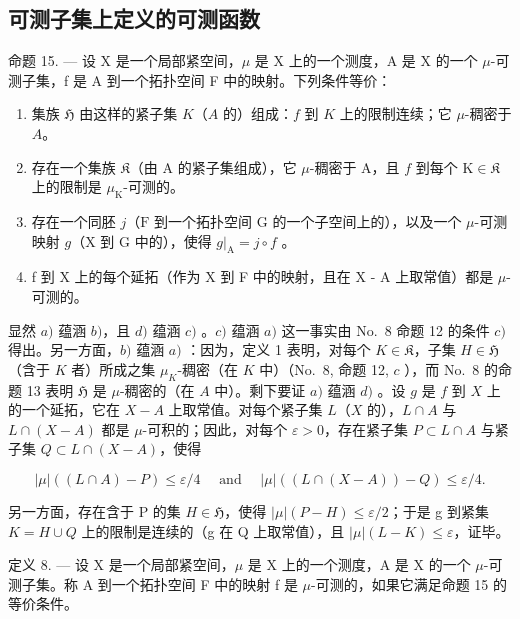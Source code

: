 \subsection{可测子集上定义的可测函数}

命题 15. --- 设 X 是一个局部紧空间，\(\mu\) 是 X 上的一个测度，A 是 X 的一个 \(\mu\)-可测子集，f 是 A 到一个拓扑空间 F 中的映射。下列条件等价：

\begin{enumerate}
\def\labelenumi{\alph{enumi})}
\item
  集族 \(\mathfrak{H}\) 由这样的紧子集 \(K\)（\(A\) 的）组成：\(f\) 到 \(K\) 上的限制连续；它 \(\mu\)-稠密于 \(A\)。
\item
  存在一个集族 \(\mathfrak{K}\)（由 A 的紧子集组成），它 \(\mu\)-稠密于 A，且 \(f\) 到每个 \(\mathrm{K} \in \mathfrak{K}\) 上的限制是 \(\mu_{\mathrm{K}}\)-可测的。
\item
  存在一个同胚 \(j\)（\(\mathrm{F}\) 到一个拓扑空间 \(\mathrm{G}\) 的一个子空间上的），以及一个 \(\mu\)-可测映射 \(g\)（\(\mathrm{X}\) 到 \(\mathrm{G}\) 中的），使得 \(g|_{\mathrm{A}} = j \circ f\) 。
\item
  f 到 X 上的每个延拓（作为 X 到 F 中的映射，且在 X - A 上取常值）都是 \(\mu\)-可测的。
\end{enumerate}

显然 \(a)\) 蕴涵 \(b)\)，且 \(d)\) 蕴涵 \(c)\) 。\(c)\) 蕴涵 \(a)\) 这一事实由 No.~8 命题 12 的条件 \(c)\) 得出。另一方面，\(b)\) 蕴涵 \(a)\) ：因为，定义 1 表明，对每个 \(K \in \mathfrak{K}\)，子集 \(H \in \mathfrak{H}\)（含于 \(K\) 者）所成之集 \(\mu_{K}\)-稠密（在 \(K\) 中）（No.~8, 命题 12, \(c\) ），而 No.~8 的命题 13 表明 \(\mathfrak{H}\) 是 \(\mu\)-稠密的（在 \(A\) 中）。剩下要证 \(a)\) 蕴涵 \(d)\) 。设 \(g\) 是 \(f\) 到 \(X\) 上的一个延拓，它在 \(X - A\) 上取常值。对每个紧子集 \(L\)（\(X\) 的），\(L \cap A\) 与 \(L \cap (X - A)\) 都是 \(\mu\)-可积的；因此，对每个 \(\varepsilon > 0\)，存在紧子集 \(P \subset L \cap A\) 与紧子集 \(Q \subset L \cap (X - A)\)，使得

\[
| \mu | ((L \cap A) - P) \leqslant \varepsilon / 4 \quad \text { and } \quad | \mu | ((L \cap (X - A)) - Q) \leqslant \varepsilon / 4.
\]

另一方面，存在含于 P 的集 \(H \in \mathfrak{H}\)，使得 \(|\mu|(P - H) \leqslant \varepsilon/2\)；于是 g 到紧集 \(K = H \cup Q\) 上的限制是连续的（g 在 Q 上取常值），且 \(|\mu|(L - K) \leqslant \varepsilon\)，证毕。

定义 8. --- 设 X 是一个局部紧空间，\(\mu\) 是 X 上的一个测度，A 是 X 的一个 \(\mu\)-可测子集。称 A 到一个拓扑空间 F 中的映射 f 是 \(\mu\)-可测的，如果它满足命题 15 的等价条件。

